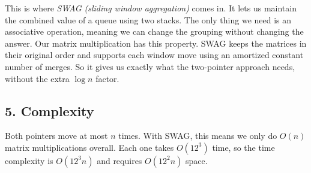 \documentclass[11pt,a4paper]{article}
\begin{document}
This is where \emph{SWAG (sliding window aggregation)} comes in. It lets
us maintain the combined value of a queue using two stacks. The only
thing we need is an associative operation, meaning we can change the
grouping without changing the answer. Our matrix multiplication has
this property. SWAG keeps the matrices in their original order and
supports each window move using an amortized constant number of merges.
So it gives us exactly what the two-pointer approach needs, without
the extra $\log n$ factor.

\subsection*{5. Complexity}

Both pointers move at most $n$ times. With SWAG, this means we only
do $O(n)$ matrix multiplications overall. Each one takes $O(12^3)$ time,
so the time complexity is $O(12^3n)$ and requires $O(12^2n)$ space.
\end{document}
